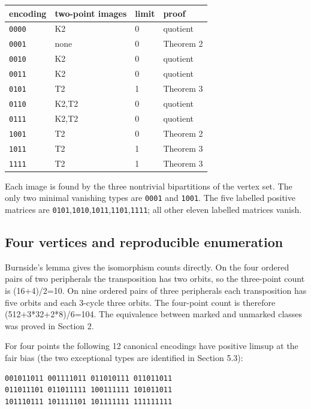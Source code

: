 \documentclass[11pt]{article}
\begin{document}
\begin{center}\small
\begin{tabularx}{\linewidth}{XXXX}
\toprule
encoding & two-point images & limit & proof\\
\midrule
\texttt{0000} & K2 & 0 & quotient\\
\texttt{0001} & none & 0 & Theorem 2\\
\texttt{0010} & K2 & 0 & quotient\\
\texttt{0011} & K2 & 0 & quotient\\
\texttt{0101} & T2 & 1 & Theorem 3\\
\texttt{0110} & K2,T2 & 0 & quotient\\
\texttt{0111} & K2,T2 & 0 & quotient\\
\texttt{1001} & T2 & 0 & Theorem 2\\
\texttt{1011} & T2 & 1 & Theorem 3\\
\texttt{1111} & T2 & 1 & Theorem 3\\
\bottomrule
\end{tabularx}
\end{center}

Each image is found by the three nontrivial bipartitions of the vertex set. The only two minimal vanishing types are \texttt{0001} and \texttt{1001}. The five labelled positive matrices are \texttt{0101},\texttt{1010},\texttt{1011},\texttt{1101},\texttt{1111}; all other eleven labelled matrices vanish.

\subsection{Four vertices and reproducible enumeration}

Burnside's lemma gives the isomorphism counts directly. On the four ordered pairs of two peripherals the transposition has two orbits, so the three-point count is (16+4)/2=10. On nine ordered pairs of three peripherals each transposition has five orbits and each 3-cycle three orbits. The four-point count is therefore (512+3*32+2*8)/6=104. The equivalence between marked and unmarked classes was proved in Section 2.

For four points the following 12 canonical encodings have positive limsup at the fair bias (the two exceptional types are identified in Section 5.3):

\begin{Verbatim}[fontsize=\small]
001011011 001111011 011010111 011011011
011011101 011011111 100111111 101011011
101110111 101111101 101111111 111111111
\end{Verbatim}
\end{document}
